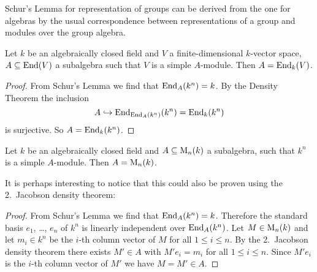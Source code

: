 \begin{rem}
  Schur’s Lemma for representation of groups can be derived from the one for algebras by the usual correspondence between representations of a group and modules over the group algebra.
\end{rem}


\begin{cor}
  Let $k$ be an algebraically closed field and $V$ a finite-dimensional $k$-vector space, $A \subseteq \operatorname{End}(V)$ a subalgebra such that $V$ is a simple $A$-module.
  Then $A = \operatorname{End}_k(V)$.
\end{cor}
\begin{proof}
  From Schur’s Lemma we find that $\operatorname{End}_A(k^n) = k$.
  By the Density Theorem the inclusion
  \[
                    A
    \hookrightarrow \operatorname{End}_{\operatorname{End}_A(k^n)}(k^n)
    =               \operatorname{End}_k(k^n)
  \]
  is surjective.
  So $A = \operatorname{End}_k(k^n)$.
\end{proof}


\begin{cor}
  Let $k$ be an algebraically closed field and $A \subseteq \operatorname{M}_n(k)$ a subalgebra, such that $k^n$ is a simple $A$-module.
  Then $A = \operatorname{M}_n(k)$.
\end{cor}


It is perhaps interesting to notice that this could also be proven using the 2.\ Jacobson density theorem:


\begin{proof}
  From Schur’s Lemma we find that $\operatorname{End}_A(k^n) = k$.
  Therefore the standard basis $e_1$, \dots, $e_n$ of $k^n$ is linearly independent over $\operatorname{End}_A(k^n)$.
  Let $M \in \operatorname{M}_n(k)$ and let $m_i \in k^n$ be the $i$-th column vector of $M$ for all $1 \leq i \leq n$.
  By the 2.\ Jacobson density theorem there exists $M' \in A$ with $M' e_i = m_i$ for all $1 \leq i \leq n$.
  Since $M' e_i$ is the $i$-th column vector of $M'$ we have $M = M' \in A$.
\end{proof}


